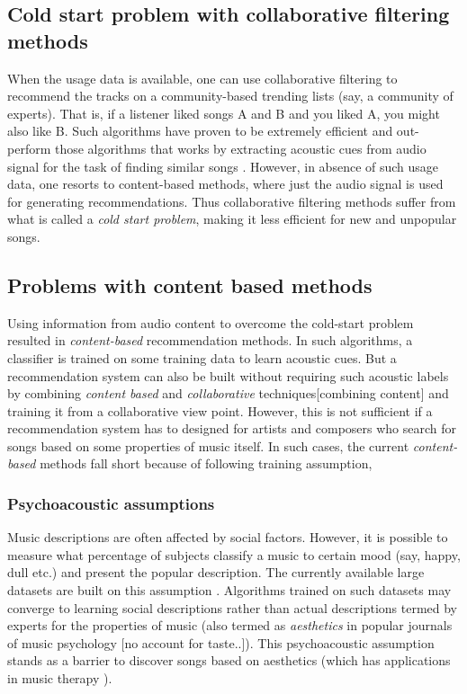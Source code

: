 \subsection{Cold start problem with collaborative filtering methods}
When the usage data is available, one can use collaborative filtering to recommend the tracks on a community-based trending lists (say, a community of experts). That is, if a listener liked songs A and B and you liked A, you might also like B. Such algorithms have proven to be extremely efficient and out-perform those algorithms that works by extracting acoustic cues from audio signal for the task of finding similar songs \cite{DC1}. However, in absence of such usage data, one resorts to content-based methods, where just the audio signal is used for generating recommendations. Thus collaborative filtering methods suffer from what is called a \textit{cold start problem}, making it less efficient for new and unpopular songs. 


\subsection{Problems with content based methods}
\label{problems}
Using information from audio content to overcome the cold-start problem resulted in \textit{content-based} recommendation methods. In such algorithms, a classifier is trained on some training data to learn acoustic cues. But a recommendation system can also be built without requiring  such acoustic labels by combining \textit{content based} and \textit{collaborative} techniques[combining content] and training it from a collaborative view point. However, this is not sufficient if a recommendation system has to designed for artists and composers who search for songs based on some properties of music itself. In such cases, the current \textit{content-based} methods fall short because of following training assumption,   

\subsubsection{Psychoacoustic assumptions}
Music descriptions are often affected by social factors. However, it is possible to measure what percentage of subjects classify a music to certain mood (say, happy, dull etc.) and present the popular description. The currently available large datasets are built on this assumption \cite{MSD}\cite{MTT}. Algorithms trained on such datasets may converge to learning social descriptions rather than actual descriptions termed by experts for the properties of music (also termed as \textit{aesthetics} in popular journals of music psychology [no account for taste..]). This psychoacoustic assumption stands as a barrier to discover songs based on aesthetics (which has applications in music therapy \cite{MusicTherapy}).

